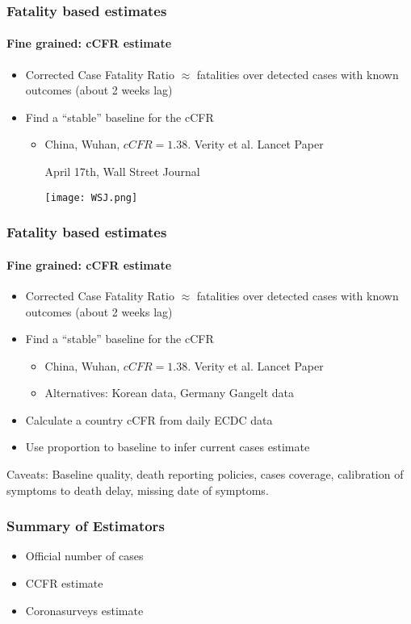 \documentclass{beamer}
\begin{document}
\begin{frame}
  \frametitle{Fatality based estimates}
  \framesubtitle{Fine grained: cCFR estimate}
  \begin{itemize}
    \item Corrected Case Fatality Ratio $\approx$ fatalities over detected cases with known outcomes (about 2 weeks lag)
    \item Find a ``stable'' baseline for the cCFR 
      \begin{itemize}
        \item China, Wuhan, $cCFR=1.38$.  Verity et al. Lancet Paper 
          \begin{block}{April 17th, Wall Street Journal}
          \begin{center}
          \texttt{[image: WSJ.png]}
          \end{center}
          \end{block}
      \end{itemize}
  \end{itemize}
\end{frame}

\begin{frame}
  \frametitle{Fatality based estimates}
  \framesubtitle{Fine grained: cCFR estimate}
  \begin{itemize}
    \item Corrected Case Fatality Ratio $\approx$ fatalities over detected cases with known outcomes (about 2 weeks lag)
    \item Find a ``stable'' baseline for the cCFR 
      \begin{itemize}
        \item China, Wuhan, $cCFR=1.38$.  Verity et al. Lancet Paper 
        \item Alternatives: Korean data, Germany Gangelt data
      \end{itemize}
    \item Calculate a country cCFR from daily ECDC data 
    \item Use proportion to baseline to infer current cases estimate
  \end{itemize} \pause

  Caveats: Baseline quality, death reporting policies, cases coverage, calibration of symptoms to death delay, missing date of symptoms.
\end{frame}

\begin{frame}
\frametitle{Summary of Estimators}
\begin{itemize}
\item Official number of cases
\item CCFR estimate
\item Coronasurveys estimate
\end{itemize}
\end{frame}
\end{document}
